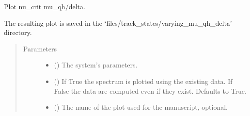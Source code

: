 \documentclass[letterpaper,10pt,english]{sphinxmanual}
\begin{document}
\begin{fulllineitems}
\label{\detokenize{modules:modules.utils.plot_nu_crit_vs_mu_qh_delta}}
\pysigstartsignatures
{}
\pysigstopsignatures
\sphinxAtStartPar
Plot nu\_crit  mu\_qh/delta.

\sphinxAtStartPar
The resulting plot is saved in the ‘files/track\_states/varying\_mu\_qh\_delta’ directory.
\begin{quote}\begin{description}
\item[{Parameters}] \leavevmode\begin{itemize}
\item {} 
\sphinxAtStartPar
{} () \textendash{} The system’s parameters.

\item {} 
\sphinxAtStartPar
{} () \textendash{} If True the spectrum is plotted using the existing data.
If False the data are computed even if they exist. Defaults to True.

\item {} 
\sphinxAtStartPar
{} () \textendash{} The name of the plot used for the manuscript, optional.

\end{itemize}

\end{description}\end{quote}

\end{fulllineitems}

\end{document}
